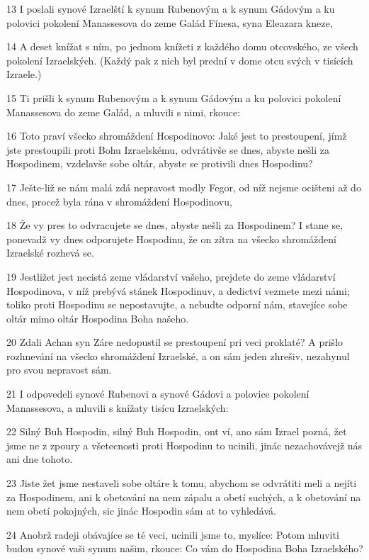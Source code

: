 \par 13 I poslali synové Izraelští k synum Rubenovým a k synum Gádovým a ku polovici pokolení Manassesova do zeme Galád Fínesa, syna Eleazara kneze,
\par 14 A deset knížat s ním, po jednom knížeti z každého domu otcovského, ze všech pokolení Izraelských. (Každý pak z nich byl prední v dome otcu svých v tisících Izraele.)
\par 15 Ti prišli k synum Rubenovým a k synum Gádovým a ku polovici pokolení Manassesova do zeme Galád, a mluvili s nimi, rkouce:
\par 16 Toto praví všecko shromáždení Hospodinovo: Jaké jest to prestoupení, jímž jste prestoupili proti Bohu Izraelskému, odvrátivše se dnes, abyste nešli za Hospodinem, vzdelavše sobe oltár, abyste se protivili dnes Hospodinu?
\par 17 Ješte-liž se nám malá zdá nepravost modly Fegor, od níž nejsme ocišteni až do dnes, procež byla rána v shromáždení Hospodinovu,
\par 18 Že vy pres to odvracujete se dnes, abyste nešli za Hospodinem? I stane se, ponevadž vy dnes odporujete Hospodinu, že on zítra na všecko shromáždení Izraelské rozhevá se.
\par 19 Jestližet jest necistá zeme vládarství vašeho, prejdete do zeme vládarství Hospodinova, v níž prebývá stánek Hospodinuv, a dedictví vezmete mezi námi; toliko proti Hospodinu se nepostavujte, a nebudte odporní nám, stavejíce sobe oltár mimo oltár Hospodina Boha našeho.
\par 20 Zdali Achan syn Záre nedopustil se prestoupení pri veci proklaté? A prišlo rozhnevání na všecko shromáždení Izraelské, a on sám jeden zhrešiv, nezahynul pro svou nepravost sám.
\par 21 I odpovedeli synové Rubenovi a synové Gádovi a polovice pokolení Manassesova, a mluvili s knížaty tisícu Izraelských:
\par 22 Silný Buh Hospodin, silný Buh Hospodin, ont ví, ano sám Izrael pozná, žet jsme ne z zpoury a všetecnosti proti Hospodinu to ucinili, jinác nezachovávejž nás ani dne tohoto.
\par 23 Jiste žet jsme nestaveli sobe oltáre k tomu, abychom se odvrátiti meli a nejíti za Hospodinem, ani k obetování na nem zápalu a obetí suchých, a k obetování na nem obetí pokojných, sic jinác Hospodin sám at to vyhledává.
\par 24 Anobrž radeji obávajíce se té veci, ucinili jsme to, myslíce: Potom mluviti budou synové vaši synum našim, rkouce: Co vám do Hospodina Boha Izraelského?
